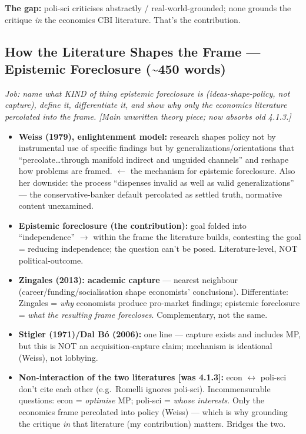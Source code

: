 \documentclass[12pt,a4paper]{article}
\begin{document}
\begin{doublespace}
\textbf{The gap:} poli-sci criticises abstractly / real-world-grounded; none grounds the critique \textit{in} the economics CBI literature. That's the contribution.

\subsection{How the Literature Shapes the Frame --- Epistemic Foreclosure (\textasciitilde450 words)}

\textit{Job: name what KIND of thing epistemic foreclosure is (ideas-shape-policy, not capture), define it, differentiate it, and show why only the economics literature percolated into the frame. [Main unwritten theory piece; now absorbs old 4.1.3.]}

\begin{itemize}
    \item \textbf{Weiss (1979), enlightenment model:} research shapes policy not by instrumental use of specific findings but by generalizations/orientations that ``percolate\ldots through manifold indirect and unguided channels'' and reshape how problems are framed. $\leftarrow$ the mechanism for epistemic foreclosure. Also her downside: the process ``dispenses invalid as well as valid generalizations'' --- the conservative-banker default percolated as settled truth, normative content unexamined.
    \item \textbf{Epistemic foreclosure (the contribution):} goal folded into ``independence'' $\rightarrow$ within the frame the literature builds, contesting the goal = reducing independence; the question can't be posed. Literature-level, NOT political-outcome.
    \item \textbf{Zingales (2013): academic capture} --- nearest neighbour (career/funding/socialisation shape economists' conclusions). Differentiate: Zingales = \textit{why} economists produce pro-market findings; epistemic foreclosure = \textit{what the resulting frame forecloses}. Complementary, not the same.
    \item \textbf{Stigler (1971)/Dal B\'{o} (2006):} one line --- capture exists and includes MP, but this is NOT an acquisition-capture claim; mechanism is ideational (Weiss), not lobbying.
    \item \textbf{Non-interaction of the two literatures [was 4.1.3]:} econ $\leftrightarrow$ poli-sci don't cite each other (e.g.\ Romelli ignores poli-sci). Incommensurable questions: econ = \textit{optimise} MP; poli-sci = \textit{whose interests}. Only the economics frame percolated into policy (Weiss) --- which is why grounding the critique \textit{in} that literature (my contribution) matters. Bridges the two.
\end{itemize}


\end{doublespace}
\end{document}
